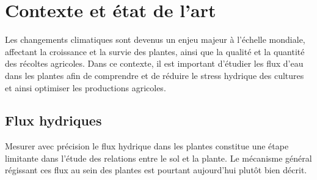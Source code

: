 \section{Contexte et état de l'art}

Les changements climatiques sont devenus un enjeu majeur à l'échelle mondiale, affectant la croissance et la survie des plantes, ainsi que la qualité et la quantité des récoltes agricoles.
Dans ce contexte, il est important d'étudier les flux d'eau dans les plantes afin de comprendre et de réduire le stress hydrique des cultures et ainsi optimiser les productions agricoles.

\subsection{Flux hydriques}

Mesurer avec précision le flux hydrique dans les plantes constitue une étape limitante dans l'étude des relations entre le sol et la plante.
Le mécanisme général régissant ces flux au sein des plantes est pourtant aujourd'hui plutôt bien décrit.
\vspace{0.5 cm}

